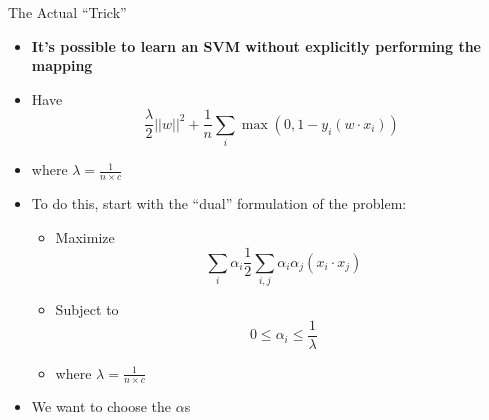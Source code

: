 \documentclass[aspectratio=169]{beamer}
\begin{document}
\begin{frame}{The Actual ``Trick''}

\begin{itemize}
\item \textbf{It's possible to learn an SVM without explicitly performing the mapping}
\item Have
	$$\frac{\lambda}{2}||w||^2 + \frac{1}{n} \sum_i \max(0, 1 - y_i (w \cdot x_i))$$
	\item where $\lambda = \frac{1}{n \times c}$
\item To do this, start with the ``dual'' formulation of the problem:
\begin{itemize}
	\item Maximize $$\sum_i \alpha_i \frac{1}{2} \sum_{i,j} \alpha_i \alpha_j (x_i \cdot x_j)$$
	\item Subject to $$0 \leq \alpha_i \leq \frac{1}{\lambda}$$
	\item where $\lambda = \frac{1}{n \times c}$

\end{itemize}
\item We want to choose the $\alpha$s
\end{itemize}
\end{frame}
\end{document}
